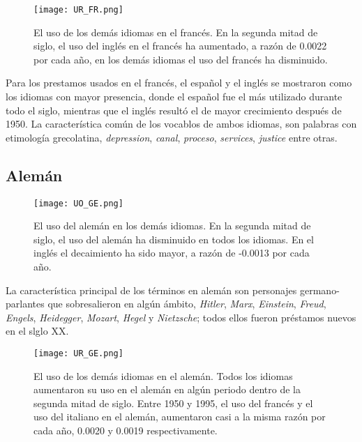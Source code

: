 \begin{figure}[h!]
	\centering
	\texttt{[image: UR\_FR.png]}
	\caption{El uso de los demás idiomas en el francés. En la segunda mitad de siglo, el uso del inglés en el francés ha aumentado, a razón de 0.0022 por cada año, en los demás idiomas el uso del francés ha disminuido. }
	\label{fig.UR_FR}
\end{figure}
		
		

		
Para los prestamos usados en el francés, el español y el inglés se mostraron como los idiomas con mayor presencia, donde el español fue el más utilizado durante todo el siglo, mientras que el inglés resultó el de mayor crecimiento después de 1950. La característica común de los vocablos de ambos idiomas, son palabras con etimología grecolatina,  \textit{depression}, \textit{canal}, \textit{proceso}, \textit{services}, \textit{justice} entre otras. 



\subsection{Alemán} %

\begin{figure}[h!]
	\centering
	\texttt{[image: UO\_GE.png]}
	\caption{El uso del alemán en los demás idiomas. En la segunda mitad de siglo, el uso del alemán ha disminuido en todos los idiomas. En el inglés el decaimiento ha sido mayor, a razón de  -0.0013 por cada año.}
	\label{fig.UO_GE}

\end{figure}

La característica principal de los términos en alemán son personajes germano-parlantes que sobresalieron en algún ámbito, \textit{Hitler}, \textit{Marx}, \textit{Einstein}, \textit{Freud}, \textit{Engels}, \textit{Heidegger}, \textit{Mozart}, \textit{Hegel} y \textit{Nietzsche}; todos ellos fueron préstamos nuevos en el slglo XX. 


\begin{figure}[h!]
	\centering
	\texttt{[image: UR\_GE.png]}
	\caption{El uso de los demás idiomas en el alemán. Todos los idiomas aumentaron su uso en el alemán en algún periodo dentro de la segunda mitad de siglo. Entre 1950 y 1995, el uso del francés y el uso del italiano en el alemán, aumentaron casi a la misma razón por cada año, 0.0020 y 0.0019 respectivamente.}
	\label{fig.UR_GE}
\end{figure}

